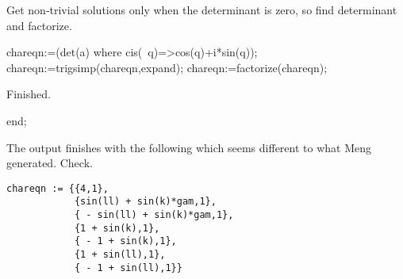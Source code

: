 \documentclass[12pt,a5paper]{article}
\begin{document}
Get non-trivial solutions only when the determinant is zero, so find determinant and factorize.
\begin{reduce}
chareqn:=(det(a) where cis(~q)=>cos(q)+i*sin(q));
chareqn:=trigsimp(chareqn,expand);
chareqn:=factorize(chareqn);
\end{reduce}

Finished. \begin{reduce} end; \end{reduce}


The output finishes with the following which seems different to what Meng generated.  Check.
\begin{verbatim}
chareqn := {{4,1},
            {sin(ll) + sin(k)*gam,1},
            { - sin(ll) + sin(k)*gam,1},
            {1 + sin(k),1},
            { - 1 + sin(k),1},
            {1 + sin(ll),1},
            { - 1 + sin(ll),1}}
\end{verbatim}
\end{document}
